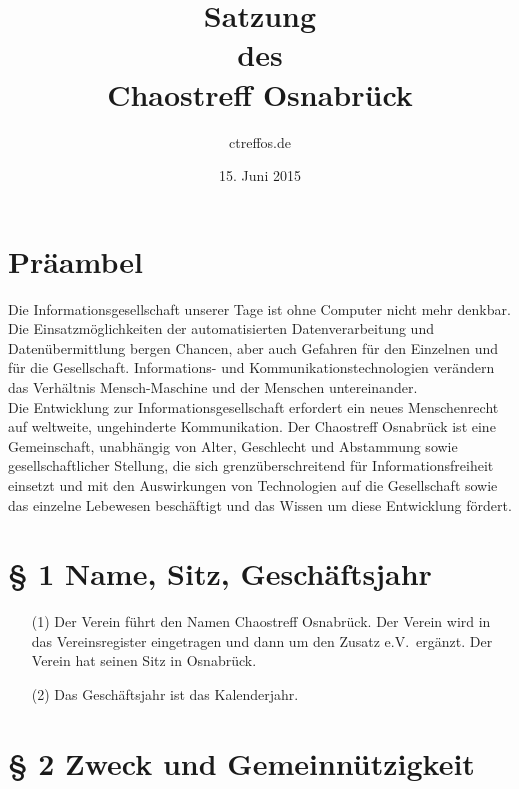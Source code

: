 \documentclass[12pt,paper=a4,ngerman]{scrreprt}
\title{Satzung\\des\\Chaostreff Osnabrück} \author{ctreffos.de}
\date{15. Juni 2015}
\begin{document}
\maketitle
\tableofcontents
\newpage

\section{Präambel}

Die Informationsgesellschaft unserer Tage ist ohne Computer nicht mehr
denkbar. Die Einsatzmöglichkeiten der automatisierten
Datenverarbeitung und Datenübermittlung bergen Chancen, aber auch
Gefahren für den Einzelnen und für die Gesellschaft. Infor\-mations-
und Kommunikationstechnologien verändern das Verhältnis
Mensch-Maschine und der Menschen untereinander. \\
Die Entwicklung zur Informationsgesellschaft erfordert ein neues
Menschenrecht auf weltweite, ungehinderte Kommunikation. Der
Chaostreff Osnabrück ist eine Gemeinschaft, unabhängig von Alter,
Geschlecht und Abstammung sowie gesellschaftlicher Stellung, die sich
grenzüberschreitend für Informationsfreiheit einsetzt und mit den
Auswirkungen von Technologien auf die Gesellschaft sowie das einzelne
Lebewesen beschäftigt und das Wissen um diese Entwicklung fördert.

\section{\S{} 1 Name, Sitz, Geschäftsjahr}

\begin{itemize}
\item[(1)]
Der Verein führt den Namen \glqq Chaostreff
Osnabrück\grqq. Der Verein wird in das Vereinsregister eingetragen und
dann um den Zusatz \glqq e.V.\grqq\ ergänzt. Der Verein hat seinen
Sitz in Osnabrück.
\item[(2)]
Das Geschäftsjahr ist das Kalenderjahr.
\end{itemize}

\section{\S{} 2 Zweck und Gemeinnützigkeit}
\end{document}
